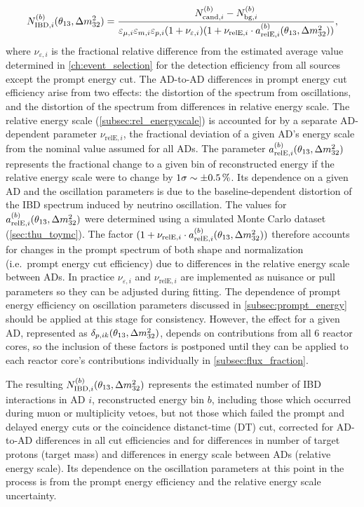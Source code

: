 \begin{equation}\label{eq:near_hall_bg_eff}
    N_{\text{IBD},i}^{(b)}(\theta_{13}, \Delta m^2_{32}) =
    \frac{N_{\text{cand},i}^{(b)} - N_{\text{bg},i}^{(b)}}{
        \varepsilon_{\mu,i}\varepsilon_{m,i}\varepsilon_{p,i}(1+\nu_{\varepsilon,i})
        (1 + \nu_{\text{relE},i}\cdot a_{\text{relE},i}^{(b)}(\theta_{13}, \Delta m^2_{32}))
    },
\end{equation}
where $\nu_{\varepsilon,i}$ is the fractional relative difference from
the estimated average value determined in \cref{ch:event_selection}
for the detection efficiency from all sources except the prompt energy cut.
The AD-to-AD differences in prompt energy cut efficiency arise from two effects:
the distortion of the spectrum from oscillations,
and the distortion of the spectrum from differences
in relative energy scale.
The relative energy scale (\cref{subsec:rel_energyscale})
is accounted for by a separate AD-dependent parameter $\nu_{\text{relE},i}$,
the fractional deviation of a given AD's energy scale
from the nominal value assumed for all ADs.
The parameter $a_{\text{relE},i}^{(b)}(\theta_{13}, \Delta m^2_{32})$
represents the fractional change to a given bin of reconstructed energy
if the relative energy scale were to change by $1\sigma \sim \SI{+-0.5}{\percent}$.
Its dependence on a given AD and the oscillation parameters is
due to the baseline-dependent distortion of the IBD spectrum
induced by neutrino oscillation.
The values for $a_{\text{relE},i}^{(b)}(\theta_{13}, \Delta m^2_{32})$ were determined using
a simulated Monte Carlo dataset (\cref{sec:thu_toymc}).
The factor $(1 + \nu_{\text{relE},i}\cdot a_{\text{relE},i}^{(b)}(\theta_{13},\Delta m^2_{32}))$
therefore accounts for changes in the prompt spectrum of
both shape and normalization (i.e.\ prompt energy cut efficiency)
due to differences in the relative energy scale between ADs.
In practice $\nu_{\varepsilon,i}$ and $\nu_{\text{relE},i}$
are implemented as nuisance or pull parameters
so they can be adjusted during fitting.
The dependence of prompt energy efficiency on oscillation parameters
discussed in \cref{subsec:prompt_energy}
should be applied at this stage for consistency.
However, the effect for a given AD, represented as $\delta_{p,ik}(\theta_{13}, \Delta m^2_{32})$,
depends on contributions from all 6 reactor cores,
so the inclusion of these factors is postponed
until they can be applied to each reactor core's contributions
individually in \cref{subsec:flux_fraction}.

The resulting $N_{\text{IBD},i}^{(b)}(\theta_{13}, \Delta m^2_{32})$ represents
the estimated number of IBD interactions in AD $i$,
reconstructed energy bin $b$,
including those which occurred during muon or multiplicity vetoes,
but not those which failed the prompt and delayed energy cuts
or the coincidence distanct-time (DT) cut,
corrected for AD-to-AD differences in all cut efficiencies
and for differences in number of target protons (target mass)
and differences in energy scale between ADs (relative energy scale).
Its dependence on the oscillation parameters at this point in the process
is from the prompt energy efficiency
and the relative energy scale uncertainty.


